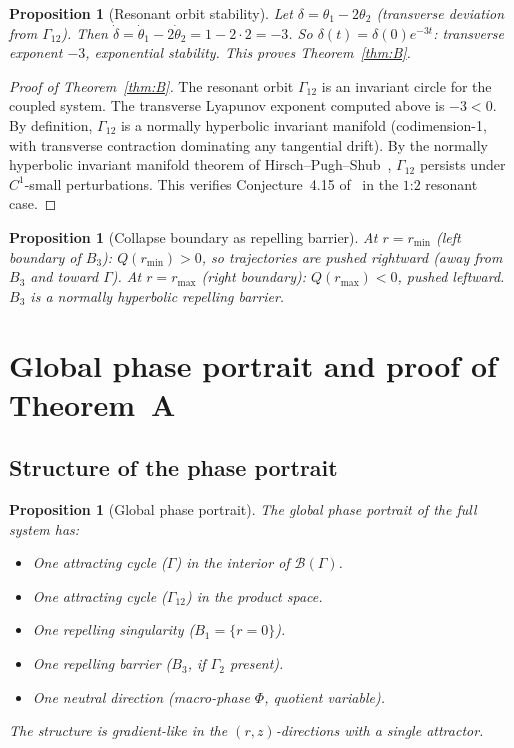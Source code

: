 \documentclass[reqno]{amsart}
\numberwithin{equation}{section}
\theoremstyle{plain}
\newtheorem{proposition}[theorem]{Proposition}
\theoremstyle{definition}
\theoremstyle{remark}
\newcommand{\Orb}{\Gamma}
\newcommand{\cB}{\mathcal{B}}
\begin{document}
\begin{proposition}[Resonant orbit stability]\label{prop:resstable}
Let $\delta=\theta_1-2\theta_2$ (transverse deviation from $\Orb_{12}$).
Then $\dot\delta=\dot\theta_1-2\dot\theta_2=1-2\cdot 2=-3$.
So $\delta(t)=\delta(0)e^{-3t}$: transverse exponent $-3$,
exponential stability. This proves Theorem~\ref{thm:B}.
\end{proposition}

\begin{proof}[Proof of Theorem~\ref{thm:B}]
The resonant orbit $\Orb_{12}$ is an invariant circle for the coupled
system. The transverse Lyapunov exponent computed above is $-3<0$.
By definition, $\Orb_{12}$ is a normally hyperbolic invariant manifold
(codimension-1, with transverse contraction dominating any tangential
drift). By the normally hyperbolic invariant manifold theorem of
Hirsch--Pugh--Shub~\cite{HPS}, $\Orb_{12}$ persists under
$C^1$-small perturbations. This verifies Conjecture~4.15
of~\cite{Paper1} in the $1$:$2$ resonant case.
\end{proof}

\begin{proposition}[Collapse boundary as repelling barrier]\label{prop:collapse}
At $r=r_{\min}$ (left boundary of $B_3$): $Q(r_{\min})>0$, so
trajectories are pushed rightward (away from $B_3$ and toward $\Orb$).
At $r=r_{\max}$ (right boundary): $Q(r_{\max})<0$, pushed leftward.
$B_3$ is a normally hyperbolic repelling barrier.
\end{proposition}

\section{Global phase portrait and proof of Theorem~A}\label{sec:portrait}

\subsection{Structure of the phase portrait}

\begin{proposition}[Global phase portrait]\label{prop:portrait}
The global phase portrait of the full system has:
\begin{itemize}[leftmargin=*]
  \item One attracting cycle ($\Orb$) in the interior of $\cB(\Orb)$.
  \item One attracting cycle ($\Orb_{12}$) in the product space.
  \item One repelling singularity ($B_1=\{r=0\}$).
  \item One repelling barrier ($B_3$, if $\Orb_2$ present).
  \item One neutral direction (macro-phase $\Phi$, quotient variable).
\end{itemize}
The structure is gradient-like in the $(r,z)$-directions with a
single attractor.
\end{proposition}
\end{document}
